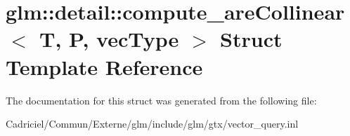 \hypertarget{structglm_1_1detail_1_1compute__are_collinear}{}\section{glm\+:\+:detail\+:\+:compute\+\_\+are\+Collinear$<$ T, P, vec\+Type $>$ Struct Template Reference}
\label{structglm_1_1detail_1_1compute__are_collinear}


The documentation for this struct was generated from the following file\+:\begin{DoxyCompactItemize}
\item 
Cadriciel/\+Commun/\+Externe/glm/include/glm/gtx/vector\+\_\+query.\+inl\end{DoxyCompactItemize}
